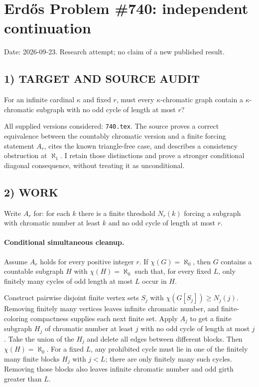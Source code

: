 \section{Erd\H{o}s Problem \#740: independent continuation}
\noindent Date: 2026-09-23. Research attempt; no claim of a new published result.
\subsection{1) TARGET AND SOURCE AUDIT}
For an infinite cardinal $\kappa$ and fixed $r$, must every $\kappa$-chromatic graph contain a $\kappa$-chromatic subgraph with no odd cycle of length at most $r$?

All supplied versions considered: \texttt{740.tex}.
The source proves a correct equivalence between the countably chromatic version and a finite forcing statement $A_r$, cites the known triangle-free case, and describes a consistency obstruction at $\aleph_1$. I retain those distinctions and prove a stronger conditional diagonal consequence, without treating it as unconditional.
\subsection{2) WORK}
Write $A_r$ for: for each $k$ there is a finite threshold $N_r(k)$ forcing a subgraph with chromatic number at least $k$ and no odd cycle of length at most $r$.

\paragraph{Conditional simultaneous cleanup.}
Assume $A_r$ holds for every positive integer $r$. If $\chi(G)=\aleph_0$, then $G$ contains a countable subgraph $H$ with $\chi(H)=\aleph_0$ such that, for every fixed $L$, only finitely many cycles of odd length at most $L$ occur in $H$.

Construct pairwise disjoint finite vertex sets $S_j$ with
$\chi(G[S_j])\ge N_j(j)$. Removing finitely many vertices leaves infinite chromatic number, and finite-coloring compactness supplies each next finite set. Apply $A_j$ to get a finite subgraph $H_j$ of chromatic number at least $j$ with no odd cycle of length at most $j$. Take the union of the $H_j$ and delete all edges between different blocks. Then $\chi(H)=\aleph_0$. For a fixed $L$, any prohibited cycle must lie in one of the finitely many finite blocks $H_j$ with $j<L$; there are only finitely many such cycles. Removing those blocks also leaves infinite chromatic number and odd girth greater than $L$.

